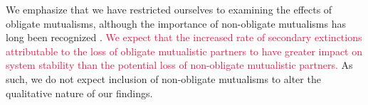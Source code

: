 \documentclass[twocolumn,preprintnumbers,amsmath,amssymb,superscriptaddress,linenumbers]{revtex4-1}
\newcommand{\rev}[1]{\textcolor{crimson}{#1}}
\begin{document}
We emphasize that we have restricted ourselves to examining the effects of obligate mutualisms, although the importance of non-obligate mutualisms has long been recognized \cite{RamosJiliberto2012,Vieira2015,Valdovinos2016,Ponisio2017,Valdovinos2019}.
\rev{We expect that the increased rate of secondary extinctions attributable to the loss of obligate mutualistic partners to have greater impact on system stability than the potential loss of non-obligate mutualistic partners.}
As such, we do not expect inclusion of non-obligate mutualisms to alter the qualitative nature of our findings.\\
\end{document}
